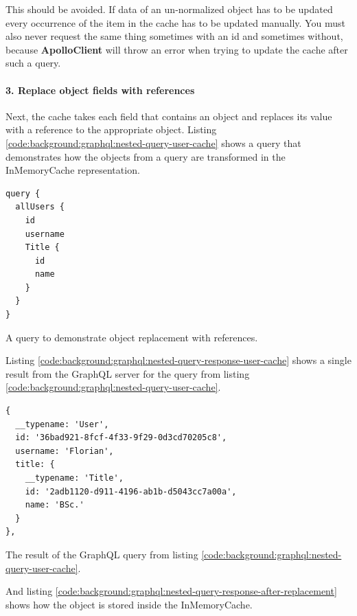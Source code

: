 \noindent This should be avoided. If data of an un-normalized object has to be updated every occurrence of the item in the cache has to be updated manually. You must also never request the same thing sometimes with an id and sometimes without, because \textbf{ApolloClient} will throw an error when trying to update the cache after such a query.

\paragraph{3. Replace object fields with references}\label{paragraph:background:graphql:apollo-server-client:data-normalization:replace-object-fields-with-references}

Next, the cache takes each field that contains an object and replaces its value with a reference to the appropriate object. Listing \ref{code:background:graphql:nested-query-user-cache} shows a query that demonstrates how the objects from a query are transformed in the InMemoryCache representation.

\ifshowListings
\begin{listing}[H]
    \begin{verbatim}
query {
  allUsers {
    id
    username
    Title {
      id
      name
    }
  }
}
    \end{verbatim}
    \caption{A query to demonstrate object replacement with references.}\label{code:background:graphql:nested-query-user-cache}
\end{listing}
\fi

Listing \ref{code:background:graphql:nested-query-response-user-cache} shows a single result from the GraphQL server for the query from listing \ref{code:background:graphql:nested-query-user-cache}.

\ifshowListings
\begin{listing}[H]
    \begin{verbatim}
{
  __typename: 'User',
  id: '36bad921-8fcf-4f33-9f29-0d3cd70205c8',
  username: 'Florian',
  title: {
    __typename: 'Title',
    id: '2adb1120-d911-4196-ab1b-d5043cc7a00a',
    name: 'BSc.'
  }
},
    \end{verbatim}
    \caption{The result of the GraphQL query from listing \ref{code:background:graphql:nested-query-user-cache}.} \label{code:background:graphql:nested-query-response-user-cache}
\end{listing}
\fi

And listing \ref{code:background:graphql:nested-query-response-after-replacement} shows how the object is stored inside the InMemoryCache.

